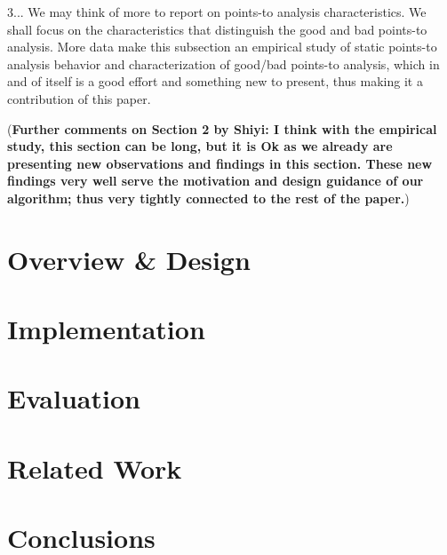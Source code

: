 \documentclass[a4paper,UKenglish]{lipics}
\begin{document}
3... We may think of more to report on points-to analysis characteristics. We shall focus on the characteristics that distinguish the good and bad points-to analysis. More data make this subsection an empirical study of static points-to analysis behavior and characterization of good/bad points-to analysis, which in and of itself is a good effort and something new to present, thus making it a contribution of this paper.

({\bf Further comments on Section 2 by Shiyi: I think with the empirical study, this section can be long, but it is Ok as we already are presenting new observations and findings in this section. These new findings very well serve the motivation and design guidance of our algorithm; thus very tightly connected to the rest of the paper.})

\section{Overview \& Design}

\section{Implementation}

\section{Evaluation}

\section{Related Work}

\section{Conclusions}
\end{document}
